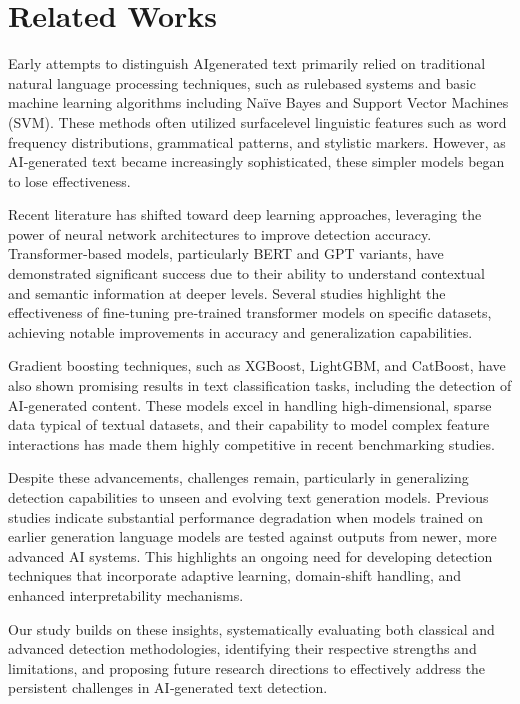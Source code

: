 
\section{Related Works}   %

Early attempts to distinguish AI\textendash generated text primarily relied on traditional natural language processing techniques, such as rule\textendash based systems and basic machine learning algorithms including Naïve Bayes and Support Vector Machines (SVM). These methods often utilized surface\textendash level linguistic features such as word frequency distributions, grammatical patterns, and stylistic markers. However, as AI‐generated text became increasingly sophisticated, these simpler models began to lose effectiveness.

Recent literature has shifted toward deep learning approaches, leveraging the power of neural network architectures to improve detection accuracy. Transformer‐based models, particularly BERT and GPT variants, have demonstrated significant success due to their ability to understand contextual and semantic information at deeper levels. Several studies highlight the effectiveness of fine‐tuning pre‐trained transformer models on specific datasets, achieving notable improvements in accuracy and generalization capabilities.

Gradient boosting techniques, such as XGBoost, LightGBM, and CatBoost, have also shown promising results in text classification tasks, including the detection of AI‐generated content. These models excel in handling high‐dimensional, sparse data typical of textual datasets, and their capability to model complex feature interactions has made them highly competitive in recent benchmarking studies.

Despite these advancements, challenges remain, particularly in generalizing detection capabilities to unseen and evolving text generation models. Previous studies indicate substantial performance degradation when models trained on earlier generation language models are tested against outputs from newer, more advanced AI systems. This highlights an ongoing need for developing detection techniques that incorporate adaptive learning, domain‐shift handling, and enhanced interpretability mechanisms.

Our study builds on these insights, systematically evaluating both classical and advanced detection methodologies, identifying their respective strengths and limitations, and proposing future research directions to effectively address the persistent challenges in AI‐generated text detection.
